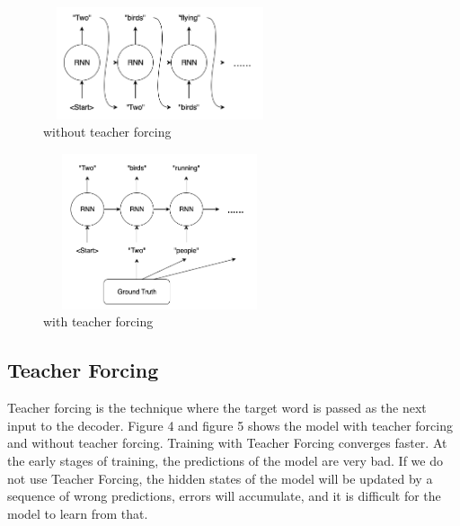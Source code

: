 \documentclass[sigconf]{acmart}
\begin{document}
\begin{figure}
    \centering
    \includegraphics[width = 2.7in, height = 1.3in]{with_teacher_forcing.png}
    \caption{without teacher forcing}
    \label{fig:4}
\end{figure}

\begin{figure}
    \centering
    \includegraphics[width = 2.7in, height = 1.8in]{without_teacher_forcing.png}
    \caption{with teacher forcing}
    \label{fig:5}
\end{figure}
\subsection{Teacher Forcing}
Teacher forcing is the technique where the target word is passed as the next input to the decoder. Figure 4 and figure 5 shows the model with teacher forcing and without teacher forcing. Training with Teacher Forcing converges faster. At the early stages of training, the predictions of the model are very bad. If we do not use Teacher Forcing, the hidden states of the model will be updated by a sequence of wrong predictions, errors will accumulate, and it is difficult for the model to learn from that.
\end{document}
